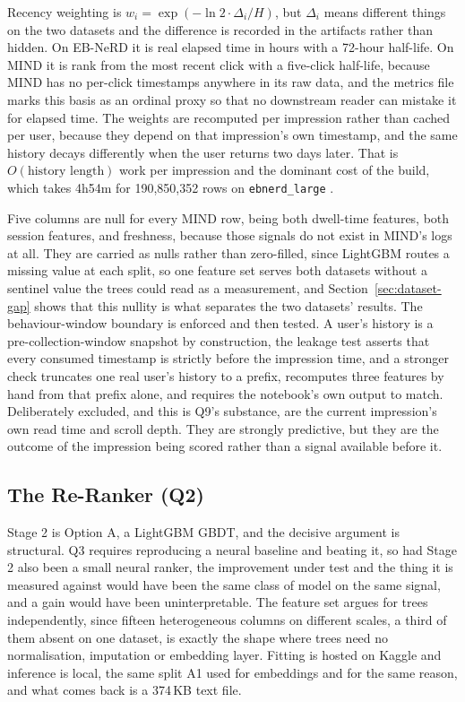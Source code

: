\documentclass[11pt]{article}
\newcommand{\code}[1]{%
    \colorbox{gray!40}{\texttt{#1}}%
}
\begin{document}
Recency weighting is $w_i = \exp(-\ln 2 \cdot \Delta_i / H)$, but $\Delta_i$
means different things on the two datasets and the difference is recorded in
the artifacts rather than hidden. On EB-NeRD it is real elapsed time in hours
with a 72-hour half-life. On MIND it is rank from the most recent click with a
five-click half-life, because MIND has no per-click timestamps anywhere in its
raw data, and the metrics file marks this basis as an ordinal proxy so that no
downstream reader can mistake it for elapsed time. The weights are recomputed
per impression rather than cached per user, because they depend on that
impression's own timestamp, and the same history decays differently when the
user returns two days later. That is $O(\text{history length})$ work per
impression and the dominant cost of the build, which takes 4h54m for
190,850,352 rows on \code{ebnerd\_large}.

Five columns are null for every MIND row, being both dwell-time features, both
session features, and freshness, because those signals do not exist in MIND's
logs at all. They are carried as nulls rather than zero-filled, since LightGBM
routes a missing value at each split, so one feature set serves both datasets
without a sentinel value the trees could read as a measurement, and
Section~\ref{sec:dataset-gap} shows that this nullity is what separates the two
datasets' results. The behaviour-window boundary is enforced and then tested.
A user's history is a pre-collection-window snapshot by construction, the
leakage test asserts that every consumed timestamp is strictly before the
impression time, and a stronger check truncates one real user's history to a
prefix, recomputes three features by hand from that prefix alone, and requires
the notebook's own output to match. Deliberately excluded, and this is Q9's
substance, are the current impression's own read time and scroll depth. They
are strongly predictive, but they are the outcome of the impression being
scored rather than a signal available before it.

\subsection{The Re-Ranker (Q2)}
\label{sec:reranker}

Stage 2 is Option A, a LightGBM GBDT, and the decisive argument is structural.
Q3 requires reproducing a neural baseline and beating it, so had Stage 2 also
been a small neural ranker, the improvement under test and the thing it is
measured against would have been the same class of model on the same signal,
and a gain would have been uninterpretable. The feature set argues for trees
independently, since fifteen heterogeneous columns on different scales, a
third of them absent on one dataset, is exactly the shape where trees need no
normalisation, imputation or embedding layer. Fitting is hosted on Kaggle and
inference is local, the same split A1 used for embeddings and for the same
reason, and what comes back is a 374\,KB text file.
\end{document}
